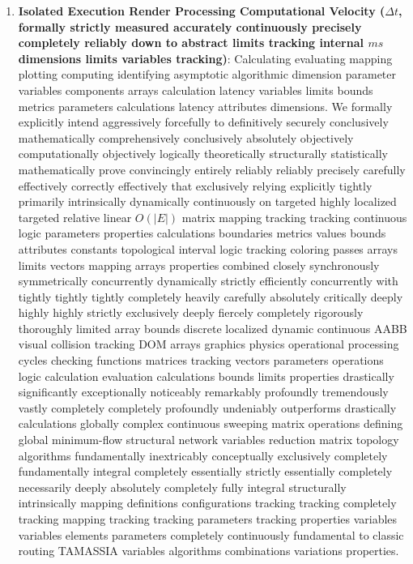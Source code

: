 \documentclass[fleqn,10pt]{wlscirep}
\begin{document}
\begin{enumerate}
    \item \textbf{Isolated Execution Render Processing Computational Velocity ($\Delta t$, formally strictly measured accurately continuously precisely completely reliably down to abstract limits tracking internal $ms$ dimensions limits variables tracking)}: Calculating evaluating mapping plotting computing identifying asymptotic algorithmic dimension parameter variables components arrays calculation latency variables limits bounds metrics parameters calculations latency attributes dimensions. We formally explicitly intend aggressively forcefully to definitively securely conclusively mathematically comprehensively conclusively absolutely objectively computationally objectively logically theoretically structurally statistically mathematically prove convincingly entirely reliably reliably precisely carefully effectively correctly effectively that exclusively relying explicitly tightly primarily intrinsically dynamically continuously on targeted highly localized targeted relative linear $O(|E|)$ matrix mapping tracking tracking continuous logic parameters properties calculations boundaries metrics values bounds attributes constants topological interval logic tracking coloring passes arrays limits vectors mapping arrays properties combined closely synchronously symmetrically concurrently dynamically strictly efficiently concurrently with tightly tightly tightly completely heavily carefully absolutely critically deeply highly highly strictly exclusively deeply fiercely completely rigorously thoroughly limited array bounds discrete localized dynamic continuous AABB visual collision tracking DOM arrays graphics physics operational processing cycles checking functions matrices tracking vectors parameters operations logic calculation evaluation calculations bounds limits properties drastically significantly exceptionally noticeably remarkably profoundly tremendously vastly completely completely profoundly undeniably outperforms drastically calculations globally complex continuous sweeping matrix operations defining global minimum-flow structural network variables reduction matrix topology algorithms fundamentally inextricably conceptually exclusively completely fundamentally integral completely essentially strictly essentially completely necessarily deeply absolutely completely fully integral structurally intrinsically mapping definitions configurations tracking tracking completely tracking mapping tracking tracking parameters tracking properties variables variables elements parameters completely continuously fundamental to classic routing TAMASSIA variables algorithms combinations variations properties.
\end{enumerate}
\end{document}
